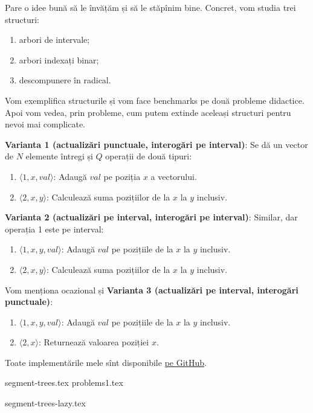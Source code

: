 Pare o idee bună să le învățăm și să le stăpînim bine.  Concret, vom studia trei structuri:

\begin{enumerate}
  \item arbori de intervale;
  \item arbori indexați binar;
  \item descompunere în radical.
\end{enumerate}

Vom exemplifica structurile și vom face benchmarks pe două probleme didactice. Apoi vom vedea, prin probleme, cum putem extinde aceleași structuri pentru nevoi mai complicate.

\textbf{Varianta 1 (actualizări punctuale, interogări pe interval)}: Se dă un vector de $N$ elemente întregi și $Q$ operații de două tipuri:

\begin{enumerate}
  \item $\langle 1, x, val \rangle$: Adaugă $val$ pe poziția $x$ a vectorului.
  \item $\langle 2, x, y \rangle$: Calculează suma pozițiilor de la $x$ la $y$ inclusiv.
\end{enumerate}

\textbf{Varianta 2 (actualizări pe interval, interogări pe interval)}: Similar, dar operația 1 este pe interval:

\begin{enumerate}
  \item $\langle 1, x, y, val \rangle$: Adaugă $val$ pe pozițiile de la $x$ la $y$ inclusiv.
  \item $\langle 2, x, y \rangle$: Calculează suma pozițiilor de la $x$ la $y$ inclusiv.
\end{enumerate}

Vom menționa ocazional și \textbf{Varianta 3 (actualizări pe interval, interogări punctuale)}:

\begin{enumerate}
  \item $\langle 1, x, y, val \rangle$: Adaugă $val$ pe pozițiile de la $x$ la $y$ inclusiv.
  \item $\langle 2, x \rangle$: Returnează valoarea poziției $x$.
\end{enumerate}

Toate implementările mele sînt disponibile \href{https://github.com/CatalinFrancu/nerdvana/tree/main/query-update}{pe GitHub}.

\begin{refsection}
  {segment-trees.tex}
  {problems1.tex}

  \nocite{cpa-segtree}
  \nocite{csa-segtree}
  \printbibliography
\end{refsection}

\begin{refsection}
  {segment-trees-lazy.tex}
\end{refsection}
